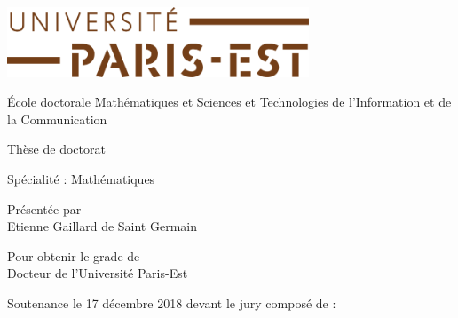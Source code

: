 

\thispagestyle{empty}
\begin{center}
\includegraphics[width=9cm]{head/logo_upe.png}


\vspace*{0.5cm}

{\large \'Ecole doctorale {\sc Math\'ematiques et Sciences et Technologies de l'Information et de la Communication}}

\vspace*{1cm}

{\huge {\sc Th\`ese de doctorat}}

\vspace*{0.5cm}

{\large Sp\'ecialit\'e : Math\'ematiques}

\vspace*{1cm}

{\large Pr\'esent\'ee par}\ \\[1ex]

{\huge {Etienne \sc Gaillard de Saint Germain}}

\vspace*{1cm}

{\large Pour obtenir le grade de \ \\[1ex]
{\sc Docteur de l'Universit\'e Paris-Est}}

\vspace*{1.2cm}

{\Huge {}}

\vspace*{0.3cm}

{\Huge {}}

\vspace*{0.5cm}

{\large {}}

\vspace*{1.5cm}

{\Large Soutenance le 17 d\'ecembre 2018 devant le jury compos\'e de :}

\end{center}

